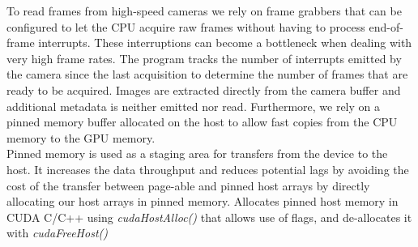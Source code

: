 To read frames from high-speed cameras we rely on frame grabbers that can be configured to let the CPU acquire raw frames without having to process end-of-frame interrupts. These interruptions can become a bottleneck when dealing with very high frame rates. The program tracks the number of interrupts emitted by the camera since the last acquisition to determine the number of frames that are ready to be acquired. Images are extracted directly from the camera buffer and additional metadata is neither emitted nor read. Furthermore, we rely on a pinned memory buffer allocated on the host to allow fast copies from the CPU memory to the GPU memory. \\

Pinned memory is used as a staging area for transfers from the device to the host. It increases the data throughput and reduces potential lags by avoiding the cost of the transfer between page-able and pinned host arrays by directly allocating our host arrays in pinned memory. Allocates pinned host memory in CUDA C/C++ using \emph{cudaHostAlloc()} that allows use of flags, and de-allocates it with \emph{cudaFreeHost()}